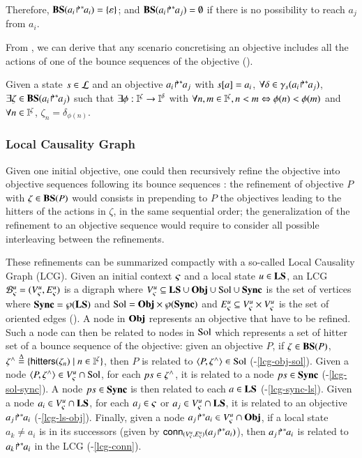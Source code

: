 Therefore,
$\mathbf{BS}({a_i\!\Rsh^*\!\!a_i}) = \{\varepsilon\}$; and
$\mathbf{BS}({a_i\!\Rsh^*\!\!a_j}) = \emptyset$ if there is no possibility to reach $a_j$ from
$a_i$.


From , we can derive that any scenario concretising an objective includes all the
actions of one of the bounce sequences of the objective ().
\begin{lemma}
Given a state $s\in \mathcal{L}$ and an objective ${a_i\!\Rsh^*\!\!a_j}$ with $s[{a}]=a_i$,
$\forall\delta\in\gamma_s({a_i\!\Rsh^*\!\!a_j})$,
$\exists\zeta\in\mathbf{BS}({a_i\!\Rsh^*\!\!a_j})$ such that
$\exists \phi: \mathbb{I}^{\zeta}\to\mathbb{I}^{\delta}$
with
$\forall n,m\in\mathbb{I}^{\zeta}, n<m \Leftrightarrow \phi(n)<\phi(m)$
and
$\forall n\in\mathbb{I}^{\zeta}$, $\zeta_n = \delta_{\phi(n)}$.
\label{lem:bs-concr}
\end{lemma}



\subsubsection{Local Causality Graph}

Given one initial objective, one could then recursively refine the objective into objective
sequences following its bounce sequences \cite{PMR12-MSCS}:
the refinement of objective $P$ with $\zeta\in\mathbf{BS}(P)$ would consists in prepending to $P$ the
objectives leading to the hitters of the actions in $\zeta$, in the same sequential order;
the generalization of the refinement to an objective sequence would require to consider all possible
interleaving between the refinements.

These refinements can be summarized compactly with a so-called Local Causality Graph (LCG).
Given an initial context $\varsigma$ and a local state $u\in\mathbf{LS}$,
an LCG ${\mathcal{B}_{\varsigma}^{u}} = (V_\varsigma^u, E_\varsigma^u)$
is a digraph where $V_\varsigma^u \subseteq \mathbf{LS}\cup \mathbf{Obj} \cup \mathrm{Sol} \cup \mathbf{Sync}$ is the set of vertices
where $\mathbf{Sync}=\wp(\mathbf{LS})$ and $\mathrm{Sol}=\mathbf{Obj}\times\wp(\mathbf{Sync})$
and $E_\varsigma^u \subseteq V_\varsigma^u \times V_\varsigma^u$ is the set of oriented edges
().
A node in $\mathbf{Obj}$ represents an objective that have to be refined.
Such a node can then be related to nodes in $\mathrm{Sol}$ which represents a set of hitter set of a
bounce sequence of the objective:
given an objective $P$, if $\zeta\in\mathbf{BS}(P)$, $\zeta^\wedge \stackrel{\Delta}= \{\mathsf{hitters}(\zeta_n) \mid
n\in\mathbb{I}^{\zeta} \}$, then $P$ is related to $\langle P, \zeta^\wedge\rangle\in\mathrm{Sol}$
(-\ref{lcg-obj-sol}).
Given a node $\langle P,\zeta^\wedge\rangle\in V_\varsigma^u\cap\mathrm{Sol}$, for each $ps\in\zeta^\wedge$,
it is related to a node $ps\in\mathbf{Sync}$
(-\ref{lcg-sol-sync}).
A node $ps\in\mathbf{Sync}$ is then related to each $a\in\mathbf{LS}$
(-\ref{lcg-sync-ls}).
Given a node $a_i\in V_\varsigma^u\cap\mathbf{LS}$, for each $a_j\in\varsigma$ or $a_j\in V_\varsigma^u\cap\mathbf{LS}$,
it is related to an objective ${a_j\!\Rsh^*\!\!a_i}$
(-\ref{lcg-ls-obj}).
Finally, given a node ${a_j\!\Rsh^*\!\!a_i}\in V_\varsigma^u\cap\mathbf{Obj}$,
if a local state $a_k\neq a_i$ is in its successors (given by
$\mathsf{conn}_{({V_\varsigma^u},{E_\varsigma^u})}({a_j\!\Rsh^*\!\!a_i})$), then
${a_j\!\Rsh^*\!\!a_i}$ is related to ${a_k\!\Rsh^*\!\!a_i}$ in the LCG
(-\ref{lcg-conn}).

